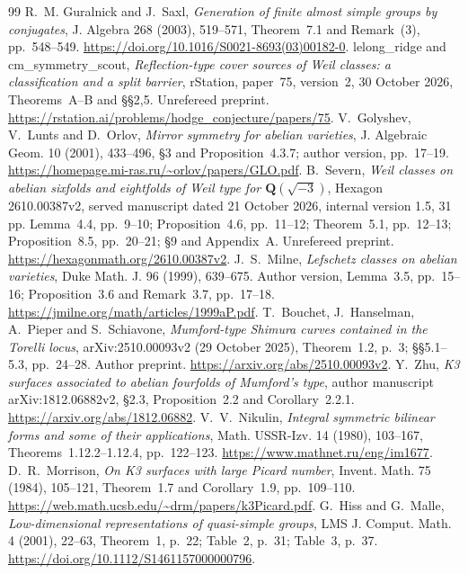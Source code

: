 \documentclass[11pt]{article}
\theoremstyle{definition}
\theoremstyle{remark}
\newcommand{\Q}{\mathbf Q}
\begin{document}
\begin{thebibliography}{99}
 R.~M. Guralnick and J.~Saxl, \emph{Generation of finite almost simple groups by conjugates}, J. Algebra 268 (2003), 519--571, Theorem~7.1 and Remark~(3), pp.~548--549. \url{https://doi.org/10.1016/S0021-8693(03)00182-0}.
 lelong\_ridge and cm\_symmetry\_scout, \emph{Reflection-type cover sources of Weil classes: a classification and a split barrier}, rStation, paper~75, version~2, 30 October 2026, Theorems~A--B and \S\S2,5. Unrefereed preprint. \url{https://rstation.ai/problems/hodge_conjecture/papers/75}.
 V.~Golyshev, V.~Lunts and D.~Orlov, \emph{Mirror symmetry for abelian varieties}, J. Algebraic Geom. 10 (2001), 433--496, \S3 and Proposition~4.3.7; author version, pp.~17--19. \url{https://homepage.mi-ras.ru/~orlov/papers/GLO.pdf}.
 B.~Severn, \emph{Weil classes on abelian sixfolds and eightfolds of Weil type for $\Q(\sqrt{-3})$}, Hexagon 2610.00387v2, served manuscript dated 21 October 2026, internal version 1.5, 31 pp. Lemma~4.4, pp.~9--10; Proposition~4.6, pp.~11--12; Theorem~5.1, pp.~12--13; Proposition~8.5, pp.~20--21; \S9 and Appendix~A. Unrefereed preprint. \url{https://hexagonmath.org/2610.00387v2}.
 J.~S.~Milne, \emph{Lefschetz classes on abelian varieties}, Duke Math. J. 96 (1999), 639--675. Author version, Lemma~3.5, pp.~15--16; Proposition~3.6 and Remark~3.7, pp.~17--18. \url{https://jmilne.org/math/articles/1999aP.pdf}.
 T.~Bouchet, J.~Hanselman, A.~Pieper and S.~Schiavone, \emph{Mumford-type Shimura curves contained in the Torelli locus}, arXiv:2510.00093v2 (29 October 2025), Theorem~1.2, p.~3; \S\S5.1--5.3, pp.~24--28. Author preprint. \url{https://arxiv.org/abs/2510.00093v2}.
 Y.~Zhu, \emph{K3 surfaces associated to abelian fourfolds of Mumford's type}, author manuscript arXiv:1812.06882v2, \S2.3, Proposition~2.2 and Corollary~2.2.1. \url{https://arxiv.org/abs/1812.06882}.
 V.~V.~Nikulin, \emph{Integral symmetric bilinear forms and some of their applications}, Math. USSR-Izv. 14 (1980), 103--167, Theorems~1.12.2--1.12.4, pp.~122--123. \url{https://www.mathnet.ru/eng/im1677}.
 D.~R.~Morrison, \emph{On K3 surfaces with large Picard number}, Invent. Math. 75 (1984), 105--121, Theorem~1.7 and Corollary~1.9, pp.~109--110. \url{https://web.math.ucsb.edu/~drm/papers/k3Picard.pdf}.
 G.~Hiss and G.~Malle, \emph{Low-dimensional representations of quasi-simple groups}, LMS J. Comput. Math. 4 (2001), 22--63, Theorem~1, p.~22; Table~2, p.~31; Table~3, p.~37. \url{https://doi.org/10.1112/S1461157000000796}.

\end{thebibliography}
\end{document}
